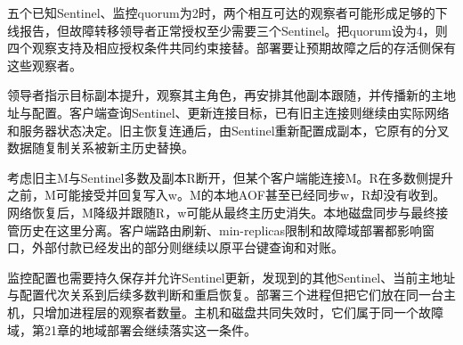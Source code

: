 五个已知Sentinel、监控quorum为2时，两个相互可达的观察者可能形成足够的下线报告，但故障转移领导者正常授权至少需要三个Sentinel。把quorum设为4，则四个观察支持及相应授权条件共同约束接替。部署要让预期故障之后的存活侧保有这些观察者。


领导者指示目标副本提升，观察其主角色，再安排其他副本跟随，并传播新的主地址与配置。客户端查询Sentinel、更新连接目标，已有旧主连接则继续由实际网络和服务器状态决定。旧主恢复连通后，由Sentinel重新配置成副本，它原有的分叉数据随复制关系被新主历史替换。

考虑旧主M与Sentinel多数及副本R断开，但某个客户端能连接M。R在多数侧提升之前，M可能接受并回复写入w。M的本地AOF甚至已经同步w，R却没有收到。网络恢复后，M降级并跟随R，w可能从最终主历史消失。本地磁盘同步与最终接管历史在这里分离。客户端路由刷新、min-replicas限制和故障域部署都影响窗口，外部付款已经发出的部分则继续以原平台键查询和对账。


监控配置也需要持久保存并允许Sentinel更新，发现到的其他Sentinel、当前主地址与配置代次关系到后续多数判断和重启恢复。部署三个进程但把它们放在同一台主机，只增加进程层的观察者数量。主机和磁盘共同失效时，它们属于同一个故障域，第21章的地域部署会继续落实这一条件。
\FloatBarrier
